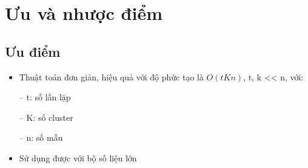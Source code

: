 \documentclass{article}
\begin{document}
	\section{Ưu và nhược điểm} %
	\subsection{Ưu điểm}
	\begin{itemize}
		\item Thuật toán đơn giản, hiệu quả với độ phức tạo là $O(tKn)$, t, k << n, với:
		\item[--]t: số lần lặp
		\item[--]K: số cluster
		\item[--]n: số mẫu
		\item Sử dụng được với bộ số liệu lớn
	\end{itemize}
\end{document}
